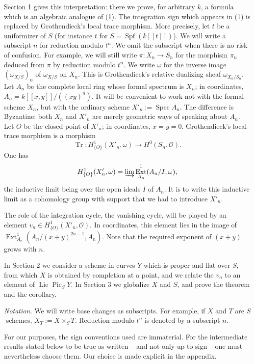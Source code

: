 \documentclass[11pt,leqno]{article}
\DeclareMathOperator{\Spec}{Spec}
\DeclareMathOperator{\Spf}{Spf}
\DeclareMathOperator{\Lie}{Lie}
\DeclareMathOperator{\Pic}{Pic}
\DeclareMathOperator{\Ext}{Ext}
\DeclareMathOperator{\Tr}{Tr}
\newcommand{\OO}{\mathcal O}
\begin{document}
Section 1 gives this interpretation: there we prove, for arbitrary $k$, a formula which is an algebraic analogue of (1). The integration sign which appears in (1) is replaced by Grothendieck's local trace morphism. More precisely, let $t$ be a uniformizer of $S$ (for instance $t$ for $S=\Spf(k[[t]])$). We will write a subscript $n$ for reduction modulo $t^n$. We omit the subscript when there is no risk of confusion. For example, we will still write $\pi:X_n\to S_n$ for the morphism $\pi_n$ deduced from $\pi$ by reduction modulo $t^n$. We write $\omega$ for the inverse image $(\omega_{X/S})_n$ of $\omega_{X/S}$ on $X_n$. This is Grothendieck's relative dualizing sheaf $\omega_{X_n/S_n}$. Let $A_n$ be the complete local ring whose formal spectrum is $X_n$; in coordinates, $A_n=k[[x,y]]/((xy)^n)$. It will be convenient to work not with the formal scheme $X_n$, but with the ordinary scheme $X'_n:=\Spec A_n$. The difference is Byzantine: both $X_n$ and $X'_n$ are merely geometric ways of speaking about $A_n$. Let $O$ be the closed point of $X'_n$; in coordinates, $x=y=0$. Grothendieck's local trace morphism is a morphism
\[
        \Tr:H^1_{\{O\}}(X'_n,\omega)\longrightarrow H^0(S_n,\OO).
\]
One has
\[
        H^1_{\{O\}}(X'_n,\omega)=\varinjlim\Ext^1_{A_n}(A_n/I,\omega),
\]
the inductive limit being over the open ideals $I$ of $A_n$. It is to write this inductive limit as a cohomology group with support that we had to introduce $X'_n$.

The role of the integration cycle, the vanishing cycle, will be played by an element $v_n\in H^1_{\{O\}}(X'_n,\OO)$. In coordinates, this element lies in the image of $\Ext^1_{A_n}(A_n/(x+y)^{2n-1},A_n)$. Note that the required exponent of $(x+y)$ grows with $n$.

In Section 2 we consider a scheme in curves $Y$ which is proper and flat over $S$, from which $X$ is obtained by completion at a point, and we relate the $v_n$ to an element of $\Lie\Pic_S Y$. In Section 3 we globalize $X$ and $S$, and prove the theorem and the corollary.

\medskip
\noindent\emph{Notation.} We will write base changes as subscripts. For example, if $X$ and $T$ are $S$-schemes, $X_T:=X\times_ST$. Reduction modulo $t^n$ is denoted by a subscript $n$.

For our purposes, the sign conventions used are immaterial. For the intermediate results stated below to be true as written -- and not only up to sign -- one must nevertheless choose them. Our choice is made explicit in the appendix.
\end{document}
